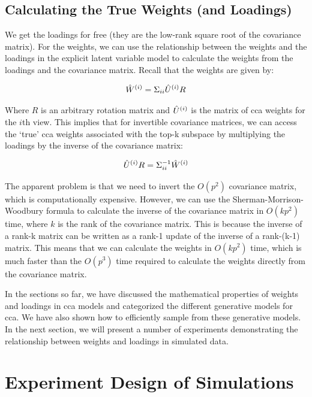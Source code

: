 \subsection{Calculating the True Weights (and Loadings)}
We get the loadings for free (they are the low-rank square root of the covariance matrix).
For the weights, we can use the relationship between the weights and the loadings in the explicit latent variable model to calculate the weights from the loadings and the covariance matrix.
Recall that the weights are given by:

\begin{align}
    \hat{W}^{(i)} = \Sigma_{ii} \hat{U}^{(i)} R
\end{align}

Where $R$ is an arbitrary rotation matrix and $\hat{U}^{(i)}$ is the matrix of \acrshort{cca} weights for the $i$th view.
This implies that for invertible covariance matrices, we can access the `true' \acrshort{cca} weights associated with the top-k subspace by multiplying the \gls{loadings} by the inverse of the covariance matrix:

\begin{align}
    \hat{U}^{(i)}R = \Sigma_{ii}^{-1} \hat{W}^{(i)}
\end{align}

The apparent problem is that we need to invert the \(O(p^2)\) covariance matrix, which is computationally expensive.
However, we can use the Sherman-Morrison-Woodbury formula to calculate the inverse of the covariance matrix in \(O(kp^2)\) time, where \(k\) is the rank of the covariance matrix.
This is because the inverse of a rank-k matrix can be written as a rank-1 update of the inverse of a rank-(k-1) matrix.
This means that we can calculate the weights in \(O(kp^2)\) time, which is much faster than the \(O(p^3)\) time required to calculate the weights directly from the covariance matrix.

In the sections so far, we have discussed the mathematical properties of weights and \gls{loadings} in \acrshort{cca} models and categorized the different generative models for \acrshort{cca}.
We have also shown how to efficiently sample from these generative models.
In the next section, we will present a number of experiments demonstrating the relationship between weights and \gls{loadings} in simulated data.

\section{Experiment Design of Simulations}

